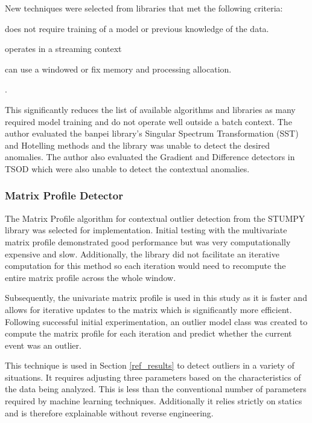 New techniques were selected from libraries that met the following criteria:
\begin{inlinelist}
    \item does not require training of a model or previous knowledge of the data.
    \item operates in a streaming context
    \item can use a windowed or fix memory and processing allocation.
\end{inlinelist}.

This significantly reduces the list of available algorithms and libraries as many required model training and do not operate well outside a batch context. The author evaluated the banpei \parencite{banpei} library's Singular Spectrum Transformation (SST) and Hotelling methods and the library was unable to detect the desired anomalies. The author also evaluated the Gradient and Difference detectors in TSOD \parencite{tsod} which were also unable to detect the contextual anomalies.

\subsubsection{Matrix Profile Detector}
\label{ref_matrix_profile_detector}

The Matrix Profile algorithm for contextual outlier detection from the STUMPY library \parencite{law2019stumpy} was selected for implementation. Initial testing with the multivariate matrix profile demonstrated good performance but was very computationally expensive and slow. Additionally, the library did not facilitate an iterative computation for this method so each iteration would need to recompute the entire matrix profile across the whole window.

Subsequently, the univariate matrix profile is used in this study as it is faster and allows for iterative updates to the matrix which is significantly more efficient. Following successful initial experimentation, an outlier model class was created to compute the matrix profile for each iteration and predict whether the current event was an outlier.

This technique is used in Section \ref{ref_results} to detect outliers in a variety of situations. It requires adjusting three parameters based on the characteristics of the data being analyzed. This is less than the conventional number of parameters required by machine learning techniques. Additionally it relies strictly on statics and is therefore explainable without reverse engineering.

